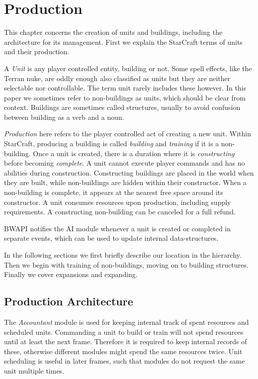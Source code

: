 \chapter{Production}
This chapter concerns the creation of units and buildings, including the architecture for its management. First we explain the StarCraft terms of units and their production.

A \emph{Unit} is any player controlled entity, building or not. Some spell effects, like the Terran nuke, are oddly enough also classified as units but they are neither selectable nor controllable. The term unit rarely includes these however. In this paper we sometimes refer to non-buildings as units, which should be clear from context. Buildings are sometimes called structures, usually to avoid confusion between building as a verb and a noun.

\emph{Production} here refers to the player controlled act of creating a new unit. Within StarCraft, producing a building is called \emph{building} and \emph{training} if it is a non-building. Once a unit is created, there is a duration where it is \emph{constructing} before becoming \emph{complete}. A unit cannot execute player commands and has no abilities during construction. Constructing buildings are placed in the world when they are built, while non-buildings are hidden within their constructor. When a non-building is complete, it appears at the nearest free space around its constructor. A unit consumes resources upon production, including supply requirements. A constructing non-building can be canceled for a full refund.

BWAPI notifies the AI module whenever a unit is created or completed in separate events, which can be used to update internal data-structures.

In the following sections we first briefly describe our location in the hierarchy. Then we begin with training of non-buildings, moving on to building structures. Finally we cover expansions and expanding.

\section{Production Architecture}
The \emph{Accountant} module is used for keeping internal track of spent resources and scheduled units. Commanding a unit to build or train will not spend resources until at least the next frame. Therefore it is required to keep internal records of these, otherwise different modules might spend the same resources twice. Unit scheduling is useful in later frames, such that modules do not request the same unit multiple times.

